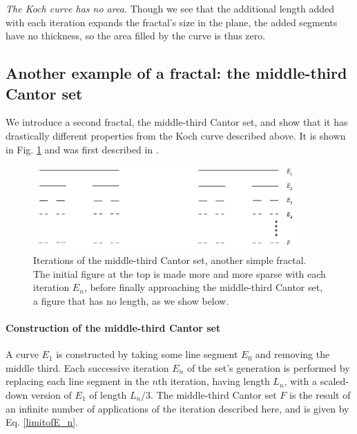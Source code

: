 \begin{myobs}\textit{The Koch curve has no area.} Though we see that the additional length added with each iteration expands the fractal's size in the plane, the added segments have no thickness, so the area filled by the curve is thus zero.\end{myobs}


\subsection{Another example of a fractal: the middle-third Cantor set}

We introduce a second fractal, the middle-third Cantor set, and show that it has drastically different properties from the Koch curve described above. It is shown in Fig. \ref{fig:cantorset} and was first described in \citep{Cantorset}.

\begin{figure}[h]
\centering
\includegraphics[width=0.9\textwidth]{Chapters/Figures/cantorset.png} 
\caption[Middle-third Cantor set]{Iterations of the middle-third Cantor set, another simple fractal. The initial figure at the top is made more and more sparse with each iteration $E_n$, before finally approaching the middle-third Cantor set, a figure that has no length, as we show below.}\label{fig:cantorset}
\end{figure}

\paragraph{Construction of the middle-third Cantor set} 
A curve $E_1$ is constructed by taking some line segment $E_0$ and removing the middle third. Each successive iteration $E_n$ of the set's generation is performed by replacing each line segment in the $n$th iteration, having length $L_n$, with a scaled-down version of $E_1$ of length $L_n/3$. The middle-third Cantor set $F$ is the result of an infinite number of applications of the iteration described here, and is given by Eq. \ref{limitofE_n}.

